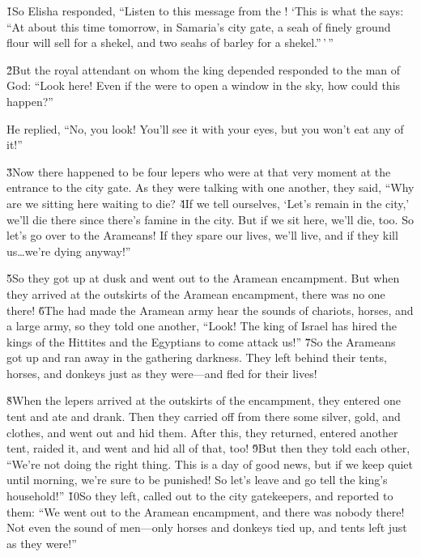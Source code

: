 \v{1}So Elisha responded, ``Listen to this message from the ! `This is what the  says: ``At about this time tomorrow, in Samaria's city gate, a seah of finely ground flour will sell for a shekel, and two seahs of barley for a shekel.''\,'\,''

\v{2}But the royal attendant on whom the king depended responded to the man of God: ``Look here! Even if the  were to open a window in the sky, how could this happen?''

He replied, ``No, you look! You'll see it with your eyes, but you won't eat any of it!''

\v{3}Now there happened to be four lepers who were at that very moment at the entrance to the city gate. As they were talking with one another, they said, ``Why are we sitting here waiting to die? \v{4}If we tell ourselves, `Let's remain in the city,' we'll die there since there's famine in the city. But if we sit here, we'll die, too. So let's go over to the Arameans! If they spare our lives, we'll live, and if they kill us{\ldots}we're dying anyway!''

\v{5}So they got up at dusk and went out to the Aramean encampment. But when they arrived at the outskirts of the Aramean encampment, there was no one there! \v{6}The  had made the Aramean army hear the sounds of chariots, horses, and a large army, so they told one another, ``Look! The king of Israel has hired the kings of the Hittites and the Egyptians to come attack us!'' \v{7}So the Arameans got up and ran away in the gathering darkness. They left behind their tents, horses, and donkeys just as they were---and fled for their lives!

\v{8}When the lepers arrived at the outskirts of the encampment, they entered one tent and ate and drank. Then they carried off from there some silver, gold, and clothes, and went out and hid them. After this, they returned, entered another tent, raided it, and went and hid all of that, too! \v{9}But then they told each other, ``We're not doing the right thing. This is a day of good news, but if we keep quiet until morning, we're sure to be punished! So let's leave and go tell the king's household!'' \v{10}So they left, called out to the city gatekeepers, and reported to them: ``We went out to the Aramean encampment, and there was nobody there! Not even the sound of men---only horses and donkeys tied up, and tents left just as they were!''

